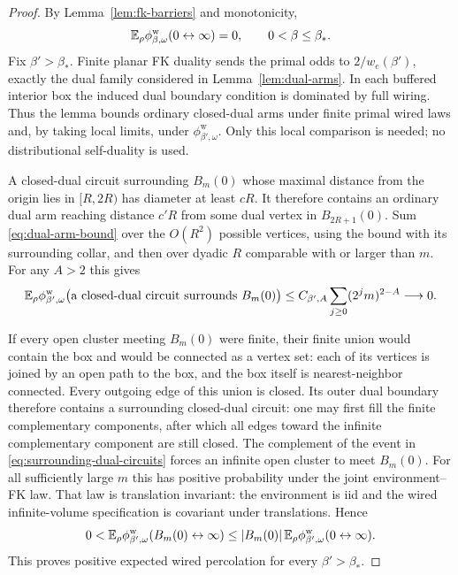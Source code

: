 \begin{proof}
By Lemma~\ref{lem:fk-barriers} and monotonicity,
\[
 \mathbb E_\rho\phi_{\beta,\omega}^{\mathrm w}
          (0\leftrightarrow\infty)=0,
                    \qquad0<\beta\le\beta_*.
\]
Fix $\beta'>\beta_*$. Finite planar FK duality sends the primal
odds to $2/w_e(\beta')$, exactly the dual family considered in
Lemma~\ref{lem:dual-arms}. In each buffered interior box the
induced dual boundary condition is dominated by full wiring. Thus
the lemma bounds ordinary closed-dual arms under finite primal
wired laws and, by taking local limits, under
$\phi_{\beta',\omega}^{\mathrm w}$. Only this local comparison
is needed; no distributional self-duality is used.

A closed-dual circuit surrounding $B_m(0)$ whose maximal distance
from the origin lies in $[R,2R)$ has diameter at least $cR$.
It therefore contains an ordinary dual arm reaching distance $c'R$
from some dual vertex in $B_{2R+1}(0)$. Sum
\eqref{eq:dual-arm-bound} over the $O(R^2)$ possible vertices,
using the bound with its surrounding collar, and then over dyadic
$R$ comparable with or larger than $m$. For any $A>2$ this gives
\begin{equation}
 \mathbb E_\rho\phi_{\beta',\omega}^{\mathrm w}
   \bigl(\text{a closed-dual circuit surrounds }B_m(0)\bigr)
       \le C_{\beta',A}\sum_{j\ge0}(2^j m)^{2-A}
                           \longrightarrow0.
 \label{eq:surrounding-dual-circuits}
\end{equation}

If every open cluster meeting $B_m(0)$ were finite, their finite
union would contain the box and would be connected as a vertex
set: each of its vertices is joined by an open path to the box,
and the box itself is nearest-neighbor connected. Every outgoing
edge of this union is closed. Its outer dual boundary therefore
contains a surrounding closed-dual circuit: one may first fill the
finite complementary components, after which all edges toward the
infinite complementary component are still closed. The complement of the
event in \eqref{eq:surrounding-dual-circuits} forces an infinite
open cluster to meet $B_m(0)$. For all sufficiently large $m$ this
has positive probability under the joint environment--FK law.
That law is translation invariant: the environment is iid and
the wired infinite-volume specification is covariant under
translations. Hence
\[
 0<\mathbb E_\rho\phi_{\beta',\omega}^{\mathrm w}
             (B_m(0)\leftrightarrow\infty)
 \le |B_m(0)|\,
       \mathbb E_\rho\phi_{\beta',\omega}^{\mathrm w}
             (0\leftrightarrow\infty).
\]
This proves positive expected wired percolation for every
$\beta'>\beta_*$.


\end{proof}
